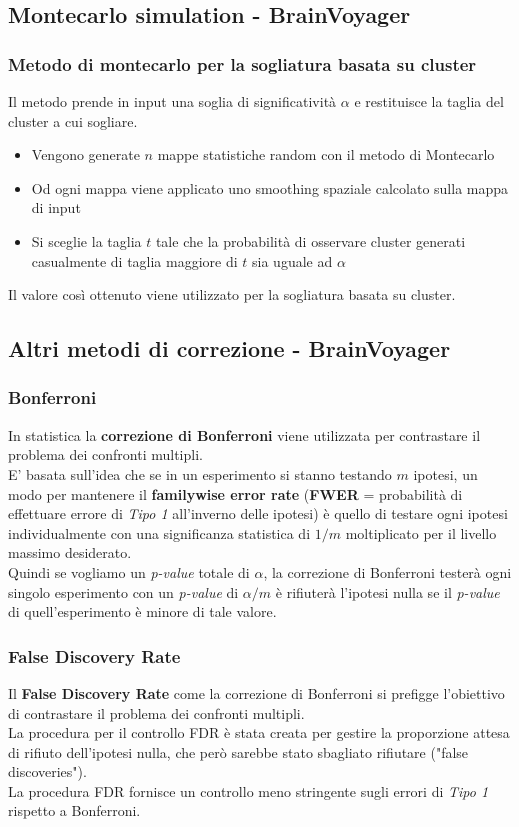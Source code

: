 \documentclass{beamer}
\begin{document}
\subsection{Montecarlo simulation - BrainVoyager}
\begin{frame}
\frametitle{Metodo di montecarlo per la sogliatura basata su cluster}
Il metodo prende in input una soglia di significatività $\alpha$ e restituisce la taglia del cluster a cui sogliare.
\begin{itemize}
\item Vengono generate $n$ mappe statistiche random con il metodo di Montecarlo
\item Od ogni mappa viene applicato uno smoothing spaziale calcolato sulla mappa di input
\item Si sceglie la taglia $t$ tale che la probabilità di osservare cluster generati casualmente di taglia maggiore di $t$ sia uguale ad $\alpha$
\end{itemize}
Il valore così ottenuto viene utilizzato per la sogliatura basata su cluster. 
\end{frame}

\subsection{Altri metodi di correzione - BrainVoyager}
\begin{frame}
\frametitle{Bonferroni}
In statistica la \textbf{correzione di Bonferroni} viene utilizzata per contrastare il problema dei confronti multipli.\\
\medskip
E' basata sull'idea che se in un esperimento si stanno testando $m$ ipotesi, un modo per mantenere il \textbf{familywise error rate} (\textbf{FWER} = probabilità di effettuare errore di \textit{Tipo 1} all'inverno delle ipotesi) è quello di testare ogni ipotesi individualmente con una significanza statistica di $1/m$ moltiplicato per il livello massimo desiderato.\\
\medskip
Quindi se vogliamo un \textit{p-value} totale di $\alpha$, la correzione di Bonferroni testerà ogni singolo esperimento con un \textit{p-value} di $\alpha/m$ è rifiuterà l'ipotesi nulla se il \textit{p-value} di quell'esperimento è minore di tale valore.
\end{frame}

\begin{frame}
\frametitle{False Discovery Rate}
Il \textbf{False Discovery Rate} come la correzione di Bonferroni si prefigge l'obiettivo di contrastare il problema dei confronti multipli.\\
\smallskip
La procedura per il controllo FDR è stata creata per gestire la proporzione attesa di rifiuto dell'ipotesi nulla,  che però sarebbe stato sbagliato rifiutare ("false discoveries").\\
\smallskip
La procedura FDR fornisce un controllo meno stringente sugli errori di \textit{Tipo 1} rispetto a Bonferroni.
\end{frame}
\end{document}
